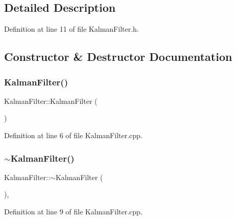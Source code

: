\subsection{Detailed Description}


Definition at line 11 of file Kalman\+Filter.\+h.



\subsection{Constructor \& Destructor Documentation}
\mbox{\label{classbfl_1_1KalmanFilter_aab2cc3677e9fcb19fff16b84c997f30a}} 
\subsubsection{\texorpdfstring{Kalman\+Filter()}{KalmanFilter()}}
{\footnotesize\ttfamily Kalman\+Filter\+::\+Kalman\+Filter (\begin{DoxyParamCaption}{ }\end{DoxyParamCaption})}



Definition at line 6 of file Kalman\+Filter.\+cpp.

\mbox{\label{classbfl_1_1KalmanFilter_ae400948b72785980cef6fe0794e481fe}} 
\subsubsection{\texorpdfstring{$\sim$\+Kalman\+Filter()}{~KalmanFilter()}}
{\footnotesize\ttfamily Kalman\+Filter\+::$\sim$\+Kalman\+Filter (\begin{DoxyParamCaption}{ }\end{DoxyParamCaption})\hspace{0.3cm}{\ttfamily [virtual]}, {\ttfamily [noexcept]}}



Definition at line 9 of file Kalman\+Filter.\+cpp.



